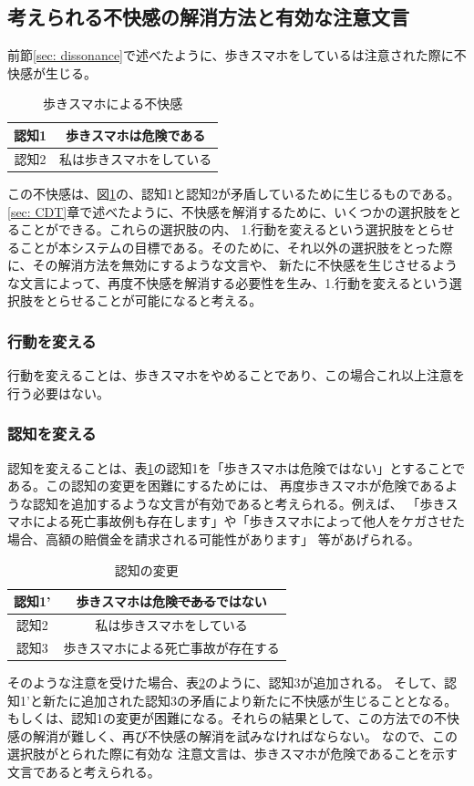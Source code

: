\documentclass[11pt,a4j]{jreport}
\begin{document}
\subsection{考えられる不快感の解消方法と有効な注意文言}
\label{sec: dissonance2}
前節\ref{sec: dissonance}で述べたように、歩きスマホをしているは注意された際に不快感が生じる。
\begin{table}[h]
  \centering
  
  
  \begin{tabular}{c|c}

      認知1 & 歩きスマホは危険である  \\ \hline
      認知2 & 私は歩きスマホをしている \\ 
  \end{tabular}
  \caption{歩きスマホによる不快感}
  \label{fig: UsingPhone}
\end{table}
この不快感は、図\ref{fig: UsingPhone}の、認知1と認知2が矛盾しているために生じるものである。
\ref{sec: CDT}章で述べたように、不快感を解消するために、いくつかの選択肢をとることができる。これらの選択肢の内、
1.行動を変えるという選択肢をとらせることが本システムの目標である。そのために、それ以外の選択肢をとった際に、その解消方法を無効にするような文言や、
新たに不快感を生じさせるような文言によって、再度不快感を解消する必要性を生み、1.行動を変えるという選択肢をとらせることが可能になると考える。

\subsubsection{行動を変える}
行動を変えることは、歩きスマホをやめることであり、この場合これ以上注意を行う必要はない。
\subsubsection{認知を変える}
認知を変えることは、表\ref{fig: UsingPhone}の認知1を「歩きスマホは危険ではない」とすることである。この認知の変更を困難にするためには、
再度歩きスマホが危険であるような認知を追加するような文言が有効であると考えられる。例えば、
「歩きスマホによる死亡事故例も存在します」や「歩きスマホによって他人をケガさせた場合、高額の賠償金を請求される可能性があります」
等があげられる。
\begin{table}[h]
  \centering
  
  
  \begin{tabular}{c|c}
      認知1' & 歩きスマホは危険\sout{である}ではない \\ \hline
      認知2 & 私は歩きスマホをしている \\ \hline
      認知3 & 歩きスマホによる死亡事故が存在する \\
  \end{tabular}
  \caption{認知の変更}
  \label{fig: AvoidDissonanceRevise}
\end{table}
そのような注意を受けた場合、表\ref{fig: AvoidDissonanceRevise}のように、認知3が追加される。
そして、認知1'と新たに追加された認知3の矛盾により新たに不快感が生じることとなる。
もしくは、認知1の変更が困難になる。それらの結果として、この方法での不快感の解消が難しく、再び不快感の解消を試みなければならない。
なので、この選択肢がとられた際に有効な
注意文言は、歩きスマホが危険であることを示す文言であると考えられる。
\end{document}
